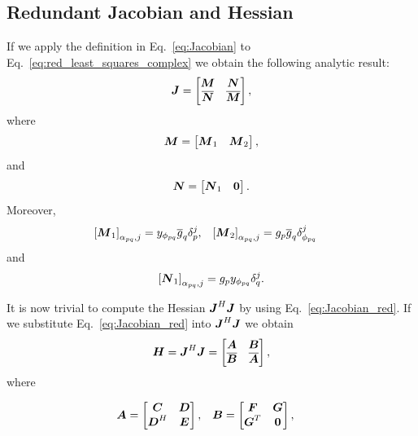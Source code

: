 \documentclass[useAMS,usenatbib]{mn2e}
\newcommand{\bA}{\bmath{A}}
\newcommand{\bB}{\bmath{B}}
\newcommand{\bC}{\bmath{C}}
\newcommand{\bE}{\bmath{E}}
\newcommand{\bF}{\bmath{F}}
\newcommand{\bG}{\bmath{G}}
\newcommand{\bJ}{\bmath{J}}
\newcommand{\bD}{\bmath{D}}
\newcommand{\bH}{\bmath{H}}
\newcommand{\bN}{\bmath{N}}
\newcommand{\bM}{\bmath{M}}
\newcommand{\bzero}{\bmath{0}}
\newcommand{\conj}[1]{\overline{#1}}
\begin{document}
\subsection{Redundant Jacobian and Hessian}
If we apply the definition in Eq.~\eqref{eq:Jacobian} to Eq.~\eqref{eq:red_least_squares_complex} we obtain the following analytic result:
\begin{equation}
\label{eq:Jacobian_red}
\bJ = \begin{bmatrix}
       \bM & \bN\\
       \conj{\bN} & \conj{\bM}
      \end{bmatrix},
\end{equation}
where
\begin{equation}
\bM =\begin{bmatrix}
      \bM_1 & \bM_2
     \end{bmatrix},
\end{equation}
and 
\begin{equation}
\bN = \begin{bmatrix}
       \bN_1 & \bzero
      \end{bmatrix}.
\end{equation}
Moreover,
\begin{align}
\left [ \bM_1 \right ]_{\alpha_{pq},j} &= y_{\phi_{pq}}\conj{g}_q\delta_p^j, & \left [ \bM_2 \right ]_{\alpha_{pq},j} &= g_p\conj{g}_q\delta_{\phi_{pq}}^j 
\end{align}
and
\begin{equation}
\left [ \bN_1 \right ]_{\alpha_{pq},j} = g_py_{\phi_{pq}}\delta^j_q. 
\end{equation}

It is now trivial to compute the Hessian $\bJ^H\bJ$ by using Eq.~\eqref{eq:Jacobian_red}. If we substitute Eq.~\eqref{eq:Jacobian_red} into $\bJ^H\bJ$
we obtain 
\begin{equation}
\label{eq:red_H}
\bH = \bJ^H\bJ = 
\begin{bmatrix}
\bA & \bB\\
\conj{\bB} & \conj{\bA}
\end{bmatrix},
\end{equation}
where

\begin{align}
\bA &= \begin{bmatrix} \bC & \bD\\ \bD^H & \bE \end{bmatrix}, & \bB &= \begin{bmatrix} \bF & \bG\\ \bG^T & \bzero \end{bmatrix},
\end{align}
\end{document}
